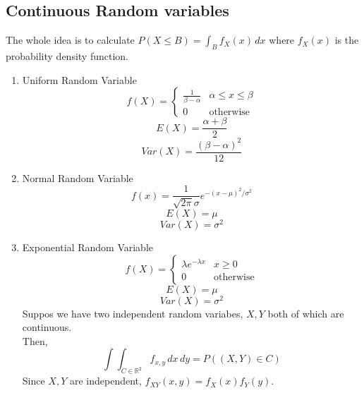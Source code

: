   \subsection*{Continuous Random variables}
    The whole idea is to calculate $P(X \le B) = \int_B f_X(x)\,dx$ where
    $f_X(x)$ is the probability density function.
  \begin{enumerate}
    \item Uniform Random Variable
    $$
      f(X) = \begin{cases} \frac{1}{\beta - \alpha} & \alpha \le x \le
      \beta\\ 0 & \text{otherwise}\end{cases}
    $$
    $$
      E(X) = \frac{\alpha + \beta}{2}
    $$
    $$
      Var(X) = \frac{(\beta - \alpha)^2}{12}
    $$
    \item Normal Random Variable
    $$
      f(x) = \frac{1}{\sqrt{2\pi}\sigma}e^{-(x - \mu)^2/ \sigma^2}
    $$
    $$
      E(X) = \mu
    $$
    $$
      Var(X) = \sigma^2
    $$
    \item Exponential Random Variable
      $$
        f(X) = \begin{cases} \lambda e^{-\lambda x} & x \ge 0\\
          0 & \text{otherwise}\end{cases}
      $$
      $$
        E(X) = \mu
      $$
      $$
        Var(X) = \sigma^2
      $$
      Suppos we have two independent random variabes, $X,Y$ both of which
      are continuous.\\
      Then, $$
        \int\int_{C \in \mathbb{R}^2} f_{x,y}\,dx\,dy = P((X,Y) \in C)
      $$
      Since $X, Y$ are independent, $f_{XY}(x,y) = f_X(x) f_Y(y)$.
  \end{enumerate}
